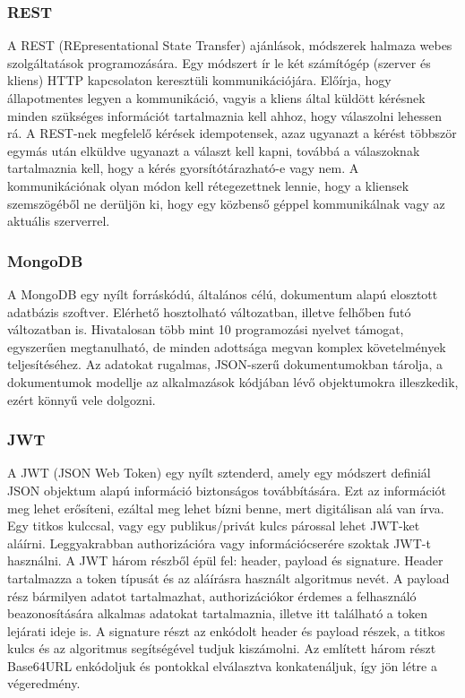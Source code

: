 \documentclass{elteikthesis}
\begin{document}
				\subsubsection{REST}
					A REST (REpresentational State Transfer) \cite{rest} ajánlások, módszerek halmaza webes szolgáltatások programozására. Egy módszert ír le két számítógép (szerver és kliens) HTTP kapcsolaton keresztüli kommunikációjára. Előírja, hogy állapotmentes legyen a kommunikáció, vagyis a kliens által küldött kérésnek minden szükséges információt tartalmaznia kell ahhoz, hogy válaszolni lehessen rá. A REST-nek megfelelő kérések idempotensek, azaz ugyanazt a kérést többször egymás után elküldve ugyanazt a választ kell kapni, továbbá a válaszoknak tartalmaznia kell, hogy a kérés gyorsítótárazható-e vagy nem. A kommunikációnak olyan módon kell rétegezettnek lennie, hogy a kliensek szemszögéből ne derüljön ki, hogy egy közbenső géppel kommunikálnak vagy az aktuális szerverrel.
				
				\subsubsection{MongoDB}
					A MongoDB \cite{mongodb} egy nyílt forráskódú, általános célú, dokumentum alapú elosztott adatbázis szoftver. Elérhető hosztolható változatban, illetve felhőben futó változatban is. Hivatalosan több mint 10 programozási nyelvet támogat, egyszerűen megtanulható, de minden adottsága megvan komplex követelmények teljesítéséhez. Az adatokat rugalmas, JSON-szerű dokumentumokban tárolja, a dokumentumok modellje az alkalmazások kódjában lévő objektumokra illeszkedik, ezért könnyű vele dolgozni.

				\subsubsection{JWT}
					A JWT (JSON Web Token) \cite{jwt} egy nyílt sztenderd, amely egy módszert definiál JSON objektum alapú információ biztonságos továbbítására. Ezt az információt meg lehet erősíteni, ezáltal meg lehet bízni benne, mert digitálisan alá van írva. Egy titkos kulccsal, vagy egy publikus/privát kulcs párossal lehet JWT-ket aláírni. Leggyakrabban authorizációra vagy információcserére szoktak JWT-t használni. A JWT három részből épül fel: header, payload és signature. Header tartalmazza a token típusát és az aláírásra használt algoritmus nevét. A payload rész bármilyen adatot tartalmazhat, authorizációkor érdemes a felhasználó beazonosítására alkalmas adatokat tartalmaznia, illetve itt található a token lejárati ideje is. A signature részt az enkódolt header és payload részek, a titkos kulcs és az algoritmus segítségével tudjuk kiszámolni. Az említett három részt Base64URL enkódoljuk és pontokkal elválasztva konkatenáljuk, így jön létre a végeredmény.
			
\end{document}
